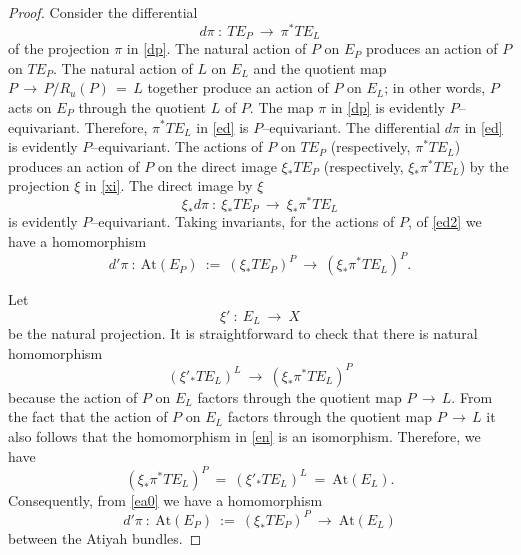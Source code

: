 \documentclass[12pt, reqno]{amsart}
\numberwithin{equation}{section}
\begin{document}
\begin{proof}
Consider the differential
\begin{equation}\label{ed}
d\pi\ :\ TE_{P}\ \longrightarrow\ \pi^*TE_{L}
\end{equation}
of the projection $\pi$ in \eqref{dp}. The natural action of $P$ on $E_P$ produces an action
of $P$ on $TE_P$. The natural action of $L$ on $E_L$ and the quotient map $P\, \longrightarrow\, P/R_u(P)\,=\, L$
together produce an action of $P$ on $E_L$; in other words, $P$ acts on $E_P$ through the quotient $L$
of $P$. The map $\pi$ in \eqref{dp} is evidently $P$--equivariant. Therefore, $\pi^*TE_{L}$ in \eqref{ed}
is $P$--equivariant. The differential $d\pi$ in \eqref{ed} is evidently $P$--equivariant.
The actions of $P$ on $TE_{P}$ (respectively, $\pi^*TE_{L}$) produces an action of $P$ on the direct image
$\xi_*TE_{P}$ (respectively, $\xi_*\pi^*TE_{L}$) by the projection $\xi$ in \eqref{xi}. The direct image by $\xi$
\begin{equation}\label{ed2}
\xi_* d\pi\ :\ \xi_* TE_{P}\ \longrightarrow\ \xi_*\pi^*TE_{L}
\end{equation}
is evidently $P$--equivariant. Taking invariants, for the actions of $P$, of \eqref{ed2} we have a homomorphism
\begin{equation}\label{ea0}
d'\pi\ :\ \text{At}(E_P) \ :=\ (\xi_* TE_{P})^P \ \longrightarrow\ (\xi_*\pi^*TE_{L})^P.
\end{equation}

Let
$$
\xi'\ :\ E_L\ \longrightarrow\ X
$$
be the natural projection. It is straightforward to check that there is natural homomorphism
\begin{equation}\label{en}
(\xi'_* TE_L)^L \ \longrightarrow\ (\xi_*\pi^*TE_{L})^P
\end{equation}
because the action of $P$ on $E_L$ factors through the quotient map $P\, \longrightarrow\, L$. From the
fact that the action of $P$ on $E_L$ factors through the quotient map $P\, \longrightarrow\, L$ it also
follows that the homomorphism in \eqref{en} is an isomorphism. Therefore, we have
$$
(\xi_*\pi^*TE_{L})^P \ = \ (\xi'_* TE_L)^L \ = \ \text{At}(E_L).
$$
Consequently, from \eqref{ea0} we have a homomorphism
\begin{equation}\label{ea}
d'\pi\ :\ \text{At}(E_P) \ :=\ (\xi_* TE_{P})^P \ \longrightarrow\ \text{At}(E_L)
\end{equation}
between the Atiyah bundles.


\end{proof}
\end{document}
